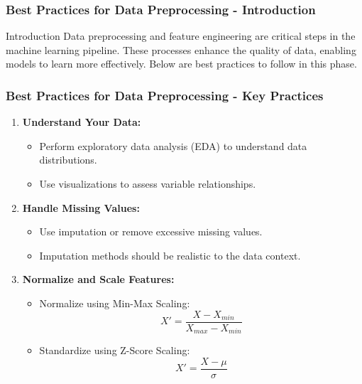 \documentclass[aspectratio=169]{beamer}
\begin{document}
\begin{frame}[fragile]
    \frametitle{Best Practices for Data Preprocessing - Introduction}
    \begin{block}{Introduction}
        Data preprocessing and feature engineering are critical steps in the machine learning pipeline. 
        These processes enhance the quality of data, enabling models to learn more effectively. 
        Below are best practices to follow in this phase.
    \end{block}
\end{frame}

\begin{frame}[fragile]
    \frametitle{Best Practices for Data Preprocessing - Key Practices}
    \begin{enumerate}
        \item \textbf{Understand Your Data:}
        \begin{itemize}
            \item Perform exploratory data analysis (EDA) to understand data distributions.
            \item Use visualizations to assess variable relationships.
        \end{itemize}
        
        \item \textbf{Handle Missing Values:}
        \begin{itemize}
            \item Use imputation or remove excessive missing values.
            \item Imputation methods should be realistic to the data context.
        \end{itemize}

        \item \textbf{Normalize and Scale Features:}
        \begin{itemize}
            \item Normalize using Min-Max Scaling:
            \begin{equation}
                X' = \frac{X - X_{min}}{X_{max} - X_{min}}
            \end{equation}
            \item Standardize using Z-Score Scaling:
            \begin{equation}
                X' = \frac{X - \mu}{\sigma}
            \end{equation}
        \end{itemize}
    \end{enumerate}
\end{frame}
\end{document}
